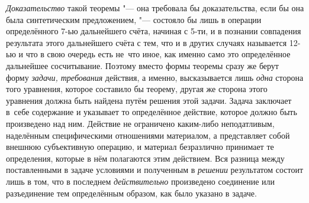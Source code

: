 {\em Доказательство} такой теоремы "--- она требовала бы доказательства, если
бы она была синтетическим предложением, "--- состояло бы лишь в операции
определённого 7-ью дальнейшего счёта, начиная с 5-ти, и в познании
совпадения результата этого дальнейшего счёта с тем, что и в других случаях
называется 12-ью и что в свою очередь есть не~что иное, как именно само это
определённое дальнейшее сосчитывание. Поэтому вместо формы теоремы сразу же
берут форму {\em задачи, требования} действия,
а именно, высказывается лишь {\em одна}
сторона того уравнения, которое составило бы теорему, другая
же сторона этого уравнения должна быть найдена путём решения этой задачи.
Задача заключает в~себе содержание и указывает то определённое действие,
которое должно быть произведено над ним. Действие не ограничено каким-либо
неподатливым, наделённым специфическими отношениями материалом, а
представляет собой внешнюю субъективную операцию, и материал безразлично
принимает те определения, которые в нём полагаются этим действием. Вся
разница между поставленными в задаче условиями и полученным в {\em решении}
результатом состоит лишь в том, что в последнем {\em действительно}
произведено соединение или разъединение тем определённым
образом, как было указано в задаче.

